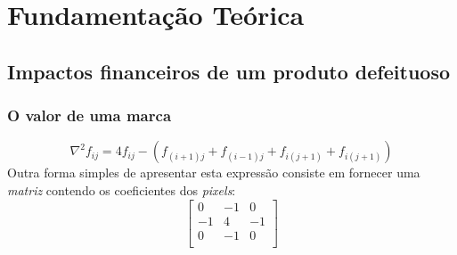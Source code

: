 


\chapter{Fundamentação Teórica}
\label{cap_revisao}

\section{Impactos financeiros de um produto defeituoso}

\subsection{O valor de uma marca}



\begin{equation}
    \nabla ^2f_{ij}=4f_{ij}-(f_{(i+1)j}+f_{(i-1)j}+f_{i(j+1)}+f_{i(j+1)})
\end{equation}
Outra forma simples de apresentar esta expressão consiste em fornecer uma \textit{matriz} contendo os coeficientes dos \textit{pixels}:
\[ \left[ \begin{array}{ccc}
 0 & -1 &  0 \\
-1 &  4 & -1 \\
 0 & -1 &  0 \\
\end{array} \right]
\]





